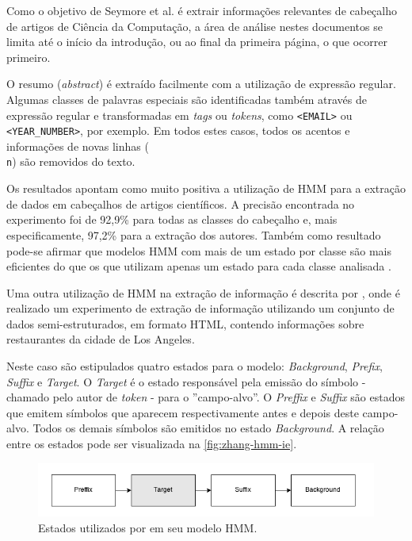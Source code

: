 \begin{textonovo}
\begin{enumerate}
\end{enumerate}

Como o objetivo de Seymore et al. é extrair informações relevantes de cabeçalho de artigos de Ciência da Computação, a área de análise nestes documentos se limita até o início da introdução, ou ao final da primeira página, o que ocorrer primeiro.

O resumo (\textit{abstract}) é extraído facilmente com a utilização de expressão regular. Algumas classes de palavras especiais são identificadas também através de expressão regular e transformadas em \textit{tags} ou \textit{tokens}, como \texttt{<EMAIL>} ou \texttt{<YEAR\_NUMBER>}, por exemplo. Em todos estes casos, todos os acentos e informações de novas linhas (\texttt{\\n}) são removidos do texto.

Os resultados apontam como muito positiva a utilização de HMM para a extração de dados em cabeçalhos de artigos científicos. A precisão encontrada no experimento foi de 92,9\% para todas as classes do cabeçalho e, mais especificamente, 97,2\% para a extração dos autores. Também como resultado pode-se afirmar que modelos HMM com mais de um estado por classe são mais eficientes do que os que utilizam apenas um estado para cada classe analisada \cite{Seymore-HMM-IE}.


Uma outra utilização de HMM na extração de informação é descrita por \cite{Zhang-HMM-IE}, onde é realizado um experimento de extração de informação utilizando um conjunto de dados semi-estruturados, em formato HTML, contendo informações sobre restaurantes da cidade de Los Angeles.

Neste caso são estipulados quatro estados para o modelo: \textit{Background}, \textit{Prefix}, \textit{Suffix} e \textit{Target}. O \textit{Target} é o estado responsável pela emissão do símbolo - chamado pelo autor de \textit{token} - para o ''campo-alvo''. O \textit{Preffix} e \textit{Suffix} são estados que emitem símbolos que aparecem respectivamente antes e depois deste campo-alvo. Todos os demais símbolos são emitidos no estado \textit{Background}. A relação entre os estados pode ser visualizada na \autoref{fig:zhang-hmm-ie}.

\begin{figure}
	\centering
	\caption{Estados utilizados por \cite{Zhang-HMM-IE} em seu modelo HMM.}
	\label{fig:zhang-hmm-ie}
	\includegraphics[width=0.8\linewidth]{./assets/zhang-hmm-ie}
\end{figure}


\end{textonovo}
